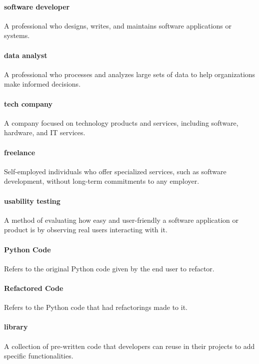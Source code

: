 \documentclass[12pt]{article}
\begin{document}
\paragraph*{software developer}
A professional who designs, writes, and maintains software applications or systems.

\paragraph*{data analyst}
A professional who processes and analyzes large sets of data to help organizations make informed decisions.

\paragraph*{tech company}
A company focused on technology products and services, including software, hardware, and IT services.

\paragraph*{freelance}
Self-employed individuals who offer specialized services, such as software development, without long-term commitments to any employer.

\paragraph*{usability testing}
A method of evaluating how easy and user-friendly a software application or product is by observing real users interacting with it.

\paragraph*{Python Code}
Refers to the original Python code given by the end user to refactor.

\paragraph*{Refactored Code}
Refers to the Python code that had refactorings made to it.

\paragraph*{library}
A collection of pre-written code that developers can reuse in their projects to add specific functionalities.
\end{document}
